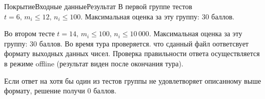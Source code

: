 \begin{problem}{Покрытие}{Входные данные}{Результат}{}
В первой группе тестов $t = 6,\, m_i \leqslant 12,\, n_i \leqslant 100$. Максимальная оценка за эту группу: $30$ баллов. 

Во втором тесте $t = 14,\, m_i \leqslant 100,\, n_i \leqslant 10\,000$. Максимальная оценка за эту группу: $30$ баллов. Во время тура проверяется. что сданный файл оответсвует формату выходных данных чисел. Проверка правильности ответа осуществляется в режиме offline (результат виден после окончания тура).

Если ответ на хотя бы один из тестов группы не удовлетворяет описанному выше формату, решение получи 0 баллов.

\end{problem} 
